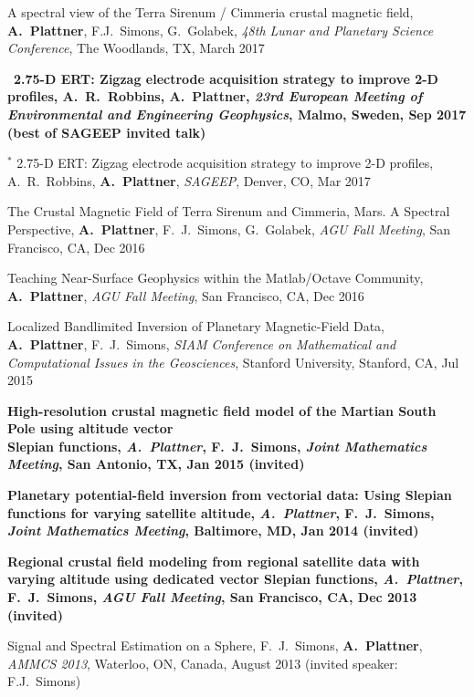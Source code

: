 \documentclass[10pt]{article}
\begin{document}
\spcp
A spectral view of the Terra Sirenum / Cimmeria crustal magnetic field, \textbf{A.~Plattner}, F.J.~Simons, G.~Golabek, \emph{48th Lunar and Planetary Science Conference}, The Woodlands, TX, March 2017

\spcp 
\hspace{-0.4cm}\ug \, \textbf{2.75-D ERT: Zigzag electrode acquisition strategy
to improve 2-D profiles,
A.~R.~Robbins, {\normalfont A.~Plattner},
\emph{23rd European Meeting of Environmental and Engineering Geophysics}, Malmo, Sweden, Sep 2017 (best of SAGEEP invited talk)}

\spcp 
\hspace{-0.4cm} $^*$ 2.75-D ERT: Zigzag electrode acquisition strategy
to improve 2-D profiles,
A.~R.~Robbins, \textbf{A.~Plattner},
\emph{SAGEEP}, Denver, CO, Mar 2017

\spcp
The Crustal Magnetic Field of Terra Sirenum and Cimmeria, Mars. A Spectral Perspective,
\textbf{A.~Plattner}, F.~J.~Simons, G.~Golabek, 
\emph{AGU Fall Meeting}, San Francisco, CA, Dec 2016

\spcp
Teaching Near-Surface Geophysics within the Matlab/Octave Community,
\textbf{A.~Plattner}, 
\emph{AGU Fall Meeting}, San Francisco, CA, Dec 2016

\spcp
Localized Bandlimited Inversion of Planetary Magnetic-Field Data,
\textbf{A.~Plattner}, F.~J.~Simons,
\emph{SIAM Conference on Mathematical and Computational Issues in the Geosciences},
Stanford University, Stanford, CA, Jul 2015


\spcp
\textbf{High-resolution crustal magnetic field model of the Martian South Pole using altitude vector\\ Slepian functions,
\emph{A.~Plattner}, F.~J.~Simons,
\emph{Joint Mathematics Meeting}, San Antonio, TX, Jan 2015 (invited)}

\spcp
\textbf{Planetary potential-field inversion from vectorial data: Using Slepian functions for varying satellite altitude,
\emph{A.~Plattner}, F.~J.~Simons,
\emph{Joint Mathematics Meeting}, Baltimore, MD, Jan 2014 (invited)}

\spcp
\textbf{Regional crustal field modeling from regional satellite data with varying altitude using dedicated vector Slepian functions,
\emph{A.~Plattner}, F.~J.~Simons,
\emph{AGU Fall Meeting}, San Francisco, CA, Dec 2013 (invited)}

\spcp
Signal and Spectral Estimation on a Sphere,
F.~J.~Simons, \textbf{A.~Plattner},
\emph{AMMCS 2013}, Waterloo, ON, Canada, August 2013 (invited speaker: F.J.~Simons)
\end{document}
